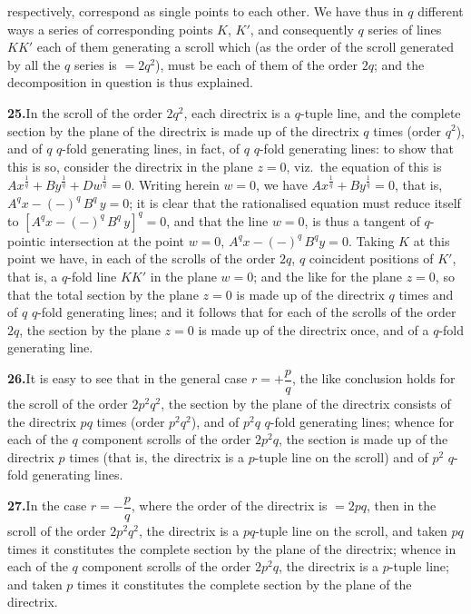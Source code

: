 \documentclass[11pt,a4paper]{article}
\begin{document}
respectively, correspond as single points to each other. We have thus in $q$
different ways a series of corresponding points $K$, $K'$, and consequently
$q$ series of lines $KK'$ each of them generating a scroll which (as the order
of the scroll generated by all the $q$ series is $= 2q^{2}$), must be each of
them of the order $2q$; and the decomposition in question is thus explained.

\textbf{25.}\quad In the scroll of the order $2q^{2}$, each directrix is a
$q$-tuple line, and the complete section by the plane of the directrix is made
up of the directrix $q$ times (order $q^{2}$), and of $q$ $q$-fold generating
lines, in fact, of $q$ $q$-fold generating lines: to show that this is so,
consider the directrix in the plane $z = 0$, viz.\ the equation of this is
$A x^{\tfrac{1}{q}} + B y^{\tfrac{1}{q}} + D w^{\tfrac{1}{q}} = 0$. Writing
herein $w = 0$, we have $A x^{\tfrac{1}{q}} + B y^{\tfrac{1}{q}} = 0$, that is,
$A^{q} x - (-)^{q}\,B^{q}\,y = 0$; it is clear that the rationalised equation
must reduce itself to $[A^{q} x - (-)^{q}\,B^{q}\,y]^{q} = 0$, and that the line
$w = 0$, is thus a tangent of $q$-pointic intersection at the point $w = 0$,
$A^{q} x - (-)^{q}\,B^{q} y = 0$. Taking $K$ at this point we have, in each of
the scrolls of the order $2q$, $q$ coincident positions of $K'$, that is, a
$q$-fold line $KK'$ in the plane $w = 0$; and the like for the plane $z = 0$,
so that the total section by the plane $z = 0$ is made up of the directrix $q$
times and of $q$ $q$-fold generating lines; and it follows that for each of the
scrolls of the order $2q$, the section by the plane $z = 0$ is made up of the
directrix once, and of a $q$-fold generating line.

\textbf{26.}\quad It is easy to see that in the general case $r = +\dfrac{p}{q}$,
the like conclusion holds for the scroll of the order $2p^{2}q^{2}$, the
section by the plane of the directrix consists of the directrix $pq$ times
(order $p^{2}q^{2}$), and of $p^{2}q$ $q$-fold generating lines; whence for
each of the $q$ component scrolls of the order $2p^{2}q$, the section is made
up of the directrix $p$ times (that is, the directrix is a $p$-tuple line on
the scroll) and of $p^{2}$ $q$-fold generating lines.

\textbf{27.}\quad In the case $r = -\dfrac{p}{q}$, where the order of the
directrix is $= 2pq$, then in the scroll of the order $2p^{2}q^{2}$, the
directrix is a $pq$-tuple line on the scroll, and taken $pq$ times it
constitutes the complete section by the plane of the directrix; whence in
each of the $q$ component scrolls of the order $2p^{2}q$, the directrix is a
$p$-tuple line; and taken $p$ times it constitutes the complete section by the
plane of the directrix.
\end{document}
